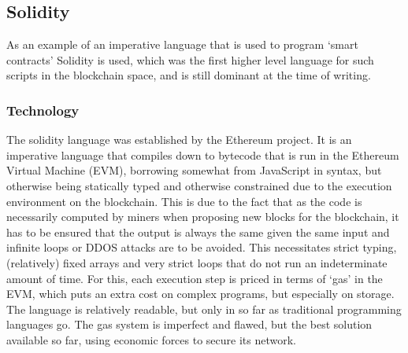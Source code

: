\documentclass[conference]{IEEEtran}
\begin{document}
\subsection{Solidity}
As an example of an imperative language that is used to program ‘smart contracts’ Solidity is used, which was the first higher level language for such scripts in the blockchain space, and is still dominant at the time of writing. \cite{SoliditySummit20202020}

\subsubsection{Technology}
The solidity language was established by the Ethereum project. \cite{gavinwoodEthereumSecureDecentralised2013} It is an imperative %
language that compiles down to bytecode that is run in the Ethereum Virtual Machine (EVM), borrowing somewhat from JavaScript in syntax, but otherwise being statically typed and otherwise constrained due to the execution environment on the blockchain. This is due to the fact that as the code is necessarily computed by miners when proposing new blocks for the blockchain, it has to be ensured that the output is always the same given the same input and infinite loops or DDOS attacks are to be avoided. 
This necessitates strict typing, (relatively) fixed arrays  and very strict loops that do not run an indeterminate amount of time. For this, each execution step is priced in terms of ‘gas’ in the EVM, which puts an extra cost on complex programs, but especially on storage. The language is relatively readable, but only in so far as traditional programming languages go. The gas system is imperfect and flawed, but the best solution available so far, using economic forces to secure its network.
\end{document}
